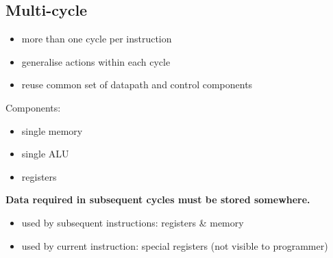 \documentclass{article}
\begin{document}
\subsection{Multi-cycle}
\begin{itemize}
	\item more than one cycle per instruction
	\item generalise actions within each cycle
	\item reuse common set of datapath and control components
\end{itemize}
Components:
\begin{itemize}
	\item single memory
	\item single ALU
	\item registers
\end{itemize}
\textbf{Data required in subsequent cycles must be stored somewhere.}
\begin{itemize}
	\item used by subsequent instructions: registers \& memory
	\item used by current instruction: special registers (not visible to programmer)
\end{itemize}
\end{document}

